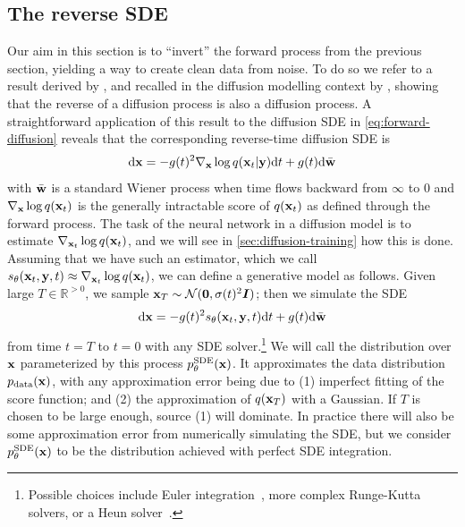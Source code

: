 \subsection{The reverse SDE} \label{sec:diffusion-forward-sde}
Our aim in this section is to ``invert'' the forward process from the previous section, yielding a way to create clean data from noise. To do so we refer to a result  derived by \citet{anderson1982reverse}, and recalled in the diffusion modelling context by \citet{song2020score}, showing that the reverse of a diffusion process is also a diffusion process. A straightforward application of this result to the diffusion SDE in \cref{eq:forward-diffusion} reveals that the corresponding reverse-time diffusion SDE is
\begin{equation} \label{eq:reverse-diffusion}
    \mathrm{d}{\mathbf{x}} = -g(t)^2 \nabla_{\mathbf{x}} \log q({\mathbf{x}}_t|{\mathbf{y}}) \mathrm{d}t + g(t) \mathrm{d}\bar{{\mathbf{w}}}
\end{equation}
with $\bar{{\mathbf{w}}}$ is a standard Wiener process when time flows backward from $\infty$ to $0$ and $\nabla_{\mathbf{x}} \log q({\mathbf{x}}_t)$ is the generally intractable score of $q({\mathbf{x}}_t)$ as defined through the forward process. The task of the neural network in a diffusion model is to estimate $\nabla_{{\mathbf{x}}_t} \log q({\mathbf{x}}_t)$, and we will see in \cref{sec:diffusion-training} how this is done. Assuming that we have such an estimator, which we call $s_\theta({\mathbf{x}}_t, {\mathbf{y}}, t) \approx \nabla_{{\mathbf{x}}_t} \log q({\mathbf{x}}_t)$, we can define a generative model as follows. Given large $T \in \mathbb{R}^{>0}$, we sample ${\mathbf{x}}_T \sim {\mathcal{N}}({\bm{0}}, \sigma(t)^2 {\bm{I}})$; then we simulate the SDE
\begin{equation} \label{eq:reverse-diffusion-with-nn}
    \mathrm{d}{\mathbf{x}} = -g(t)^2 s_\theta({\mathbf{x}}_t, {\mathbf{y}}, t) \mathrm{d}t + g(t) \mathrm{d}\bar{{\mathbf{w}}}
\end{equation}
from time $t=T$ to $t=0$ with any SDE solver.\footnote{Possible choices include Euler integration~\citep{ho2020denoising}, more complex Runge-Kutta~\citep{grathwohl2018ffjord} solvers, or a Heun solver~\citep{karras2022elucidating}.} We will call the distribution over ${\mathbf{x}}$ parameterized by this process $p_\theta^\text{SDE}({\mathbf{x}})$. It approximates the data distribution $p_{\rm{data}}({\mathbf{x}})$, with any approximation error being due to (1) imperfect fitting of the score function; and (2) the approximation of $q({\mathbf{x}}_T)$ with a Gaussian. If $T$ is chosen to be large enough, source (1) will dominate. In practice there will also be some approximation error from numerically simulating the SDE, but we consider $p_\theta^\text{SDE}({\mathbf{x}})$ to be the distribution achieved with perfect SDE integration.

